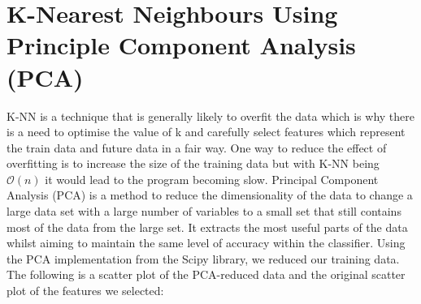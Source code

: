 \documentclass[11pt]{article}
\begin{document}
\section*{K-Nearest Neighbours Using Principle Component Analysis (PCA)}
K-NN is a technique that is generally likely to overfit the data which is why there is a need to optimise the value of k and carefully select features which represent the train data and future data in a fair way. One way to reduce the effect of overfitting is to increase the size of the training data but with K-NN being $\mathcal{O}(n)$ it would lead to the program becoming slow. Principal Component Analysis (PCA) is a method to reduce the dimensionality of the data to change a large data set with a large number of variables to a small set that still contains most of the data from the large set. It extracts the most useful parts of the data whilst aiming to maintain the same level of accuracy within the classifier. Using the PCA implementation from the Scipy library, we reduced our training data.\\

\noindent
The following is a scatter plot of the PCA-reduced data and the original scatter plot of the features we selected:


\noindent
\end{document}
